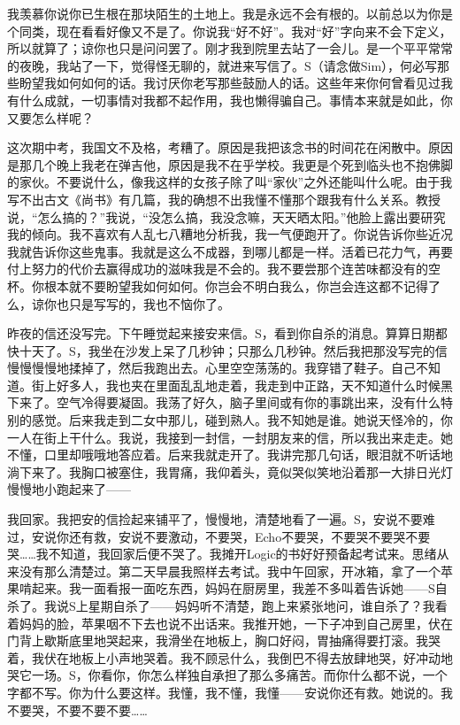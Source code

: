 \par 我羡慕你说你已生根在那块陌生的土地上。我是永远不会有根的。以前总以为你是个同类，现在看看好像又不是了。你说我“好不好”。我对“好”字向来不会下定义，所以就算了；谅你也只是问问罢了。刚才我到院里去站了一会儿。是一个平平常常的夜晚，我站了一下，觉得怪无聊的，就进来写信了。S（请念做Sim），何必写那些盼望我如何如何的话。我讨厌你老写那些鼓励人的话。这些年来你何曾看见过我有什么成就，一切事情对我都不起作用，我也懒得骗自己。事情本来就是如此，你又要怎么样呢？
\par 这次期中考，我国文不及格，考糟了。原因是我把该念书的时间花在闲散中。原因是那几个晚上我老在弹吉他，原因是我不在乎学校。我更是个死到临头也不抱佛脚的家伙。不要说什么，像我这样的女孩子除了叫“家伙”之外还能叫什么呢。由于我写不出古文《尚书》有几篇，我的确想不出我懂不懂那个跟我有什么关系。教授说，“怎么搞的？”我说，“没怎么搞，我没念嘛，天天晒太阳。”他脸上露出要研究我的倾向。我不喜欢有人乱七八糟地分析我，我一气便跑开了。你说告诉你些近况我就告诉你这些鬼事。我就是这么不成器，到哪儿都是一样。活着已花力气，再要付上努力的代价去赢得成功的滋味我是不会的。我不要尝那个连苦味都没有的空杯。你根本就不要盼望我如何如何。你岂会不明白我么，你岂会连这都不记得了么，谅你也只是写写的，我也不恼你了。
\par 昨夜的信还没写完。下午睡觉起来接安来信。S，看到你自杀的消息。算算日期都快十天了。S，我坐在沙发上呆了几秒钟；只那么几秒钟。然后我把那没写完的信慢慢慢慢地揉掉了，然后我跑出去。心里空空荡荡的。我穿错了鞋子。自己不知道。街上好多人，我也夹在里面乱乱地走着，我走到中正路，天不知道什么时候黑下来了。空气冷得要凝固。我荡了好久，脑子里间或有你的事跳出来，没有什么特别的感觉。后来我走到二女中那儿，碰到熟人。我不知她是谁。她说天怪冷的，你一人在街上干什么。我说，我接到一封信，一封朋友来的信，所以我出来走走。她不懂，口里却哦哦地答应着。后来我就走开了。我讲完那几句话，眼泪就不听话地淌下来了。我胸口被塞住，我胃痛，我仰着头，竟似哭似笑地沿着那一大排日光灯慢慢地小跑起来了——
\par 我回家。我把安的信捡起来铺平了，慢慢地，清楚地看了一遍。S，安说不要难过，安说你还有救，安说不要激动，不要哭，Echo不要哭，不要哭不要哭不要哭……我不知道，我回家后便不哭了。我摊开Logic的书好好预备起考试来。思绪从来没有那么清楚过。第二天早晨我照样去考试。我中午回家，开冰箱，拿了一个苹果啃起来。我一面看报一面吃东西，妈妈在厨房里，我差不多叫着告诉她——S自杀了。我说S上星期自杀了——妈妈听不清楚，跑上来紧张地问，谁自杀了？我看着妈妈的脸，苹果咽不下去也说不出话来。我推开她，一下子冲到自己房里，伏在门背上歇斯底里地哭起来，我滑坐在地板上，胸口好闷，胃抽痛得要打滚。我哭着，我伏在地板上小声地哭着。我不顾忌什么，我倒巴不得去放肆地哭，好冲动地哭它一场。S，你看你，你怎么样独自承担了那么多痛苦。而你什么都不说，一个字都不写。你为什么要这样。我懂，我不懂，我懂——安说你还有救。她说的。我不要哭，不要不要不要……
